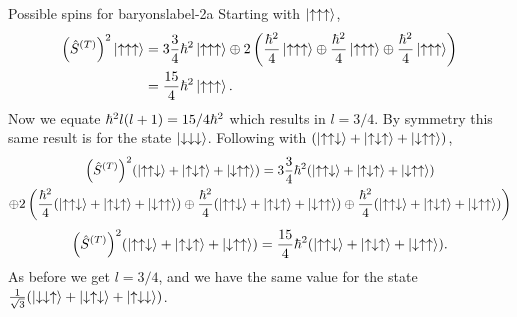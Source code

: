 \documentclass[../main.tex]{subfiles}
\begin{document}
\begin{sol}{Possible spins for baryons}{label-2a}
    Starting with $\ket{\uparrow\uparrow\uparrow}$,
    \begin{align*}
        \qty(\hat{S}^{(T)})^2\ket{\uparrow\uparrow\uparrow} &= 3\frac{3}{4}\hbar^2\ket{\uparrow\uparrow\uparrow} 
                                                    \oplus 2 \left(
                                                        \frac{\hbar^2}{4}\ket{\uparrow\uparrow\uparrow}
                                                        \oplus
                                                        \frac{\hbar^2}{4}\ket{\uparrow\uparrow\uparrow}
                                                        \oplus
                                                        \frac{\hbar^2}{4}\ket{\uparrow\uparrow\uparrow}
                                                    \right) \\
                                            &= \frac{15}{4}\hbar^2\ket{\uparrow\uparrow\uparrow}.
    \end{align*}
    Now we equate $\hbar^2 l\qty(l+1) = 15/4\hbar^2$ which results in $l=3/4$.
    By symmetry this same result is for the state $\ket{\downarrow\downarrow\downarrow}$.
    Following with $\qty(\ket{\uparrow\uparrow\downarrow}+\ket{\uparrow\downarrow\uparrow}+\ket{\downarrow\uparrow\uparrow})$,
    \begin{multline*}
        \qty(\hat{S}^{(T)})^2\qty(\ket{\uparrow\uparrow\downarrow}+\ket{\uparrow\downarrow\uparrow}+\ket{\downarrow\uparrow\uparrow}) = 3\frac{3}{4}\hbar^2\qty(\ket{\uparrow\uparrow\downarrow}+\ket{\uparrow\downarrow\uparrow}+\ket{\downarrow\uparrow\uparrow}) 
                                                    \\
                                                        \oplus 2 \left(
                                                        \frac{\hbar^2}{4}\qty(\ket{\uparrow\uparrow\downarrow}+\ket{\uparrow\downarrow\uparrow}+\ket{\downarrow\uparrow\uparrow})
                                                        \oplus
                                                        \frac{\hbar^2}{4}\qty(\ket{\uparrow\uparrow\downarrow}+\ket{\uparrow\downarrow\uparrow}+\ket{\downarrow\uparrow\uparrow})
                                                        \oplus
                                                        \frac{\hbar^2}{4}\qty(\ket{\uparrow\uparrow\downarrow}+\ket{\uparrow\downarrow\uparrow}+\ket{\downarrow\uparrow\uparrow})
                                                    \right)
    \end{multline*}
    \begin{gather*}
        \qty(\hat{S}^{(T)})^2\qty(\ket{\uparrow\uparrow\downarrow}+\ket{\uparrow\downarrow\uparrow}+\ket{\downarrow\uparrow\uparrow}) = \frac{15}{4}\hbar^2\qty(\ket{\uparrow\uparrow\downarrow}+\ket{\uparrow\downarrow\uparrow}+\ket{\downarrow\uparrow\uparrow}).
    \end{gather*}
    As before we get $l=3/4$, and we have the same value for the state $\frac{1}{\sqrt{3}}\qty(\ket{\downarrow\downarrow\uparrow}+\ket{\downarrow\uparrow\downarrow}+\ket{\uparrow\downarrow\downarrow})$. \\


\end{sol}
\end{document}
